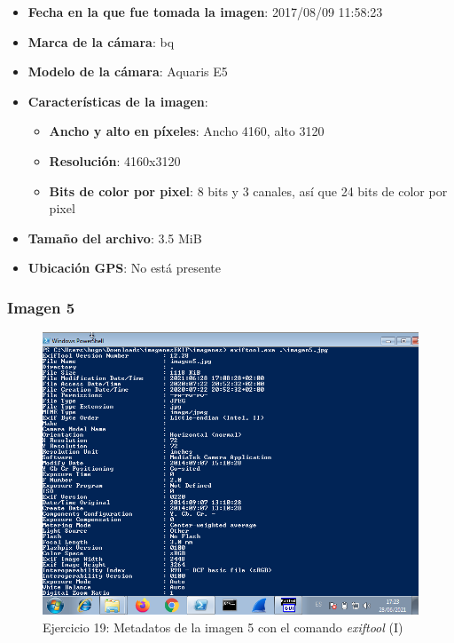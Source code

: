 \documentclass[11pt]{article}
\begin{document}
\begin{itemize}
    \item \textbf{Fecha en la que fue tomada la imagen}: 2017/08/09 11:58:23 
    \item \textbf{Marca de la cámara}: bq
    \item \textbf{Modelo de la cámara}: Aquaris E5
    \item \textbf{Características de la imagen}:
        \begin{itemize}
            \item \textbf{Ancho y alto en píxeles}: Ancho 4160, alto 3120
            \item \textbf{Resolución}: 4160x3120
            \item \textbf{Bits de color por pixel}: 8 bits y 3 canales, así que 24 bits de color por pixel
        \end{itemize}
    \item \textbf{Tamaño del archivo}: 3.5 MiB
    \item \textbf{Ubicación GPS}: No está presente 
\end{itemize}

\subsubsection{Imagen 5}

\begin{figure}[H]
    \caption{Ejercicio 19: Metadatos de la imagen 5 con el comando \textit{exiftool} (I)}
    \centering
    \includegraphics[scale=0.7]{p03/e19-11.png}
\end{figure}
\end{document}
